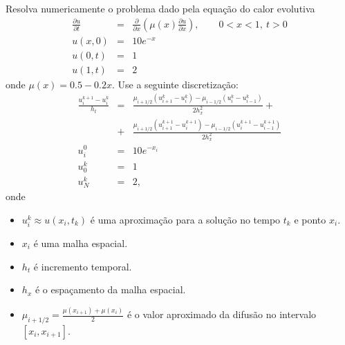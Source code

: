 \begin{exer}
Resolva numericamente o problema dado pela equação do calor evolutiva
\begin{eqnarray*}
\frac{\partial u}{\partial t}&=&\frac{\partial}{\partial x}\left(\mu(x)\frac{\partial u}{\partial x}\right),\qquad 0<x<1,\ t>0\\
u(x,0)&=&10e^{-x}\\
u(0,t)&=&1\\
u(1,t)&=&2
\end{eqnarray*}
onde $\mu(x)=0.5 - 0.2x$. Use a seguinte discretização:
\begin{eqnarray*}
\frac{u^{k+1}_i-u^{k}_i}{h_t}&=&\frac{\mu_{i+1/2}\left(u^{k}_{i+1}-u^{k}_i\right)-\mu_{i-1/2}\left(u^{k}_{i}-u^{k}_{i-1}\right)}{2h_x^2}+\\
&+&\frac{\mu_{i+1/2}\left(u^{k+1}_{i+1}-u^{k+1}_i\right)-\mu_{i-1/2}\left(u^{k+1}_{i}-u^{k+1}_{i-1}\right)}{2h_x^2}\\
u_i^0&=&10e^{-x_i}\\
u_0^{k}&=&1\\
u_N^{k}&=&2,
\end{eqnarray*}
onde
\begin{itemize}
 \item $u^k_i\approx u(x_i,t_k)$ é uma aproximação para a solução no tempo $t_k$ e ponto $x_i$.
 \item $x_i$ é uma malha espacial.
 \item $h_t$ é incremento temporal.
 \item $h_x$ é o espaçamento da malha espacial.
 \item $\mu_{i+1/2}=\frac{\mu(x_{i+1})+\mu(x_i)}{2}$ é o valor aproximado da difusão no intervalo $[x_i,x_{i+1}]$.
\end{itemize}
\end{exer}